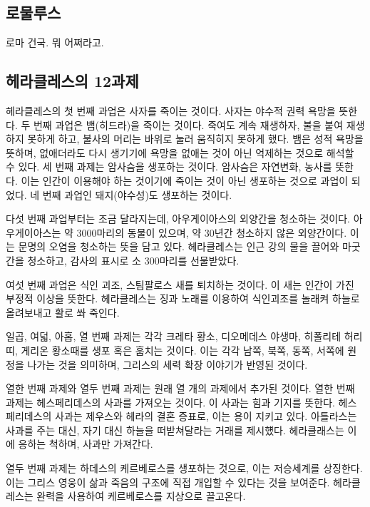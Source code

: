 \subsection{로물루스}

로마 건국. 뭐 어쩌라고.

\subsection{헤라클레스의 12과제}

헤라클레스의 첫 번째 과업은 사자를 죽이는 것이다. 사자는 야수적 권력 욕망을
뜻한다. 두 번째 과업은 뱀(히드라)을 죽이는 것이다. 죽여도 계속 재생하자, 불을
붙여 재생하지 못하게 하고, 불사의 머리는 바위로 눌러 움직히지 못하게 했다. 뱀은
성적 욕망을 뜻하며, 없애더라도 다시 생기기에 욕망을 없애는 것이 아닌 억제하는
것으로 해석할 수 있다. 세 번째 과제는 암사슴을 생포하는 것이다. 암사슴은
자연변화, 농사를 뜻한다. 이는 인간이 이용해야 하는 것이기에 죽이는 것이 아닌
생포하는 것으로 과업이 되었다. 네 번째 과업인 돼지(야수성)도 생포하는 것이다.

다섯 번째 과업부터는 조금 달라지는데, 아우게이아스의 외양간을 청소하는 것이다.
아우게이아스는 약 3000마리의 동물이 있으며, 약 30년간 청소하지 않은 외양간이다.
이는 문명의 오염을 청소하는 뜻을 담고 있다. 헤라클레스는 인근 강의 물을 끌어와
마굿간을 청소하고, 감사의 표시로 소 300마리를 선물받았다.

여섯 번째 과업은 식인 괴조, 스팀팔로스 새를 퇴치하는 것이다. 이 새는 인간이 가진
부정적 이상을 뜻한다. 헤라클레스는 징과 노래를 이용하여 식인괴조를 놀래켜 하늘로
올려보내고 활로 쏴 죽인다.

일곱, 여덟, 아홉, 열 번째 과제는 각각 크레타 황소, 디오메데스 야생마, 히폴리테
허리띠, 게리온 황소때를 생포 혹은 훔치는 것이다. 이는 각각 남쪽, 북쪽, 동쪽,
서쪽에 원정을 나가는 것을 의미하며, 그리스의 세력 확장 이야기가 반영된 것이다.

열한 번째 과제와 열두 번째 과제는 원래 열 개의 과제에서 추가된 것이다. 열한 번째
과제는 헤스페리데스의 사과를 가져오는 것이다. 이 사과는 힘과 기지를 뜻한다.
헤스페리데스의 사과는 제우스와 헤라의 결혼 증표로, 이는 용이 지키고 있다. 
아틀라스는 사과를 주는 대신, 자기 대신 하늘을 떠받쳐달라는 거래를 제시헀다.
헤라클래스는 이에 응하는 척하며, 사과만 가져간다.

열두 번째 과제는 하데스의 케르베로스를 생포하는 것으로, 이는 저승세계를 상징한다.
이는 그리스 영웅이 삶과 죽음의 구조에 직접 개입할 수 있다는 것을 보여준다. 
헤라클레스는 완력을 사용하여 케르베로스를 지상으로 끌고온다.

